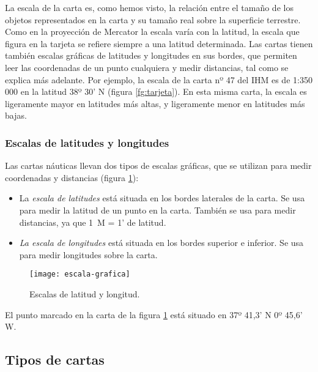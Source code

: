 La escala de la carta es, como hemos visto, la relación entre el tamaño de los objetos 
representados en la carta y su tamaño real sobre la superficie terrestre. Como en la proyección de Mercator la escala varía con la latitud, la escala que figura en la tarjeta se 
refiere siempre a una latitud determinada. Las cartas tienen también escalas gráficas de 
latitudes y longitudes en sus bordes, que permiten leer las coordenadas de un punto cualquiera y medir distancias, tal como se explica más adelante. Por ejemplo, la escala de la 
carta nº 47 del IHM es de 1:350 000 en la latitud 38º 30’ N (figura \ref{fg:tarjeta}). En esta misma 
carta, la escala es ligeramente mayor en latitudes más altas, y ligeramente menor en latitudes más bajas. 

\subsubsection{Escalas de latitudes y longitudes }


Las cartas náuticas llevan dos tipos de escalas gráficas, que se utilizan para medir coordenadas y distancias (figura \ref{fg:escala-grafica}): 
\begin{itemize}
\item La \emph{escala de latitudes} está situada en los bordes laterales de la carta. Se usa para 
medir la latitud de un punto en la carta. También se usa para medir distancias, ya 
que 1~M = 1’ de latitud. 
\item \emph{La escala de longitudes} está situada en los bordes superior e inferior. Se usa para 
medir longitudes sobre la carta. 
\end{itemize}

\begin{figure}[hbtp]
\begin{center}
\texttt{[image: escala-grafica]}\\
\caption{Escalas de latitud y longitud.}
\label{fg:escala-grafica}
\end{center}
\end{figure}

\begin{ejemplo}
El punto marcado en la carta de la figura  \ref{fg:escala-grafica} está situado en 37º 41,3’ N  0º 45,6’ W.
\end{ejemplo}

\subsection{Tipos de cartas}

